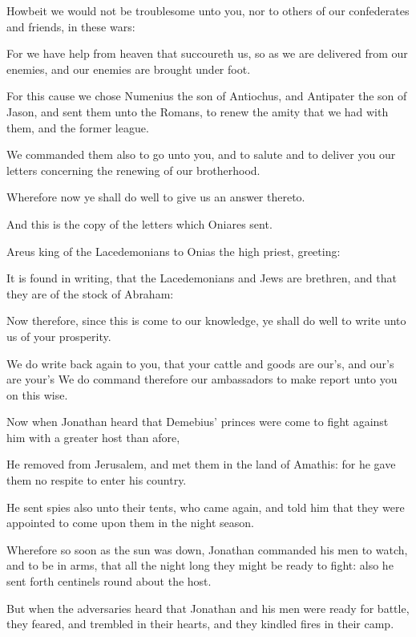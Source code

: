 {\par }{\PP {}Howbeit we would not be troublesome unto you, nor to others of our confederates and friends, in these wars:
\par }{\PP {}For we have help from heaven that succoureth us, so as we are delivered from our enemies, and our enemies are brought under foot.
\par }{\PP {}For this cause we chose Numenius the son of Antiochus, and Antipater the son of Jason, and sent them unto the Romans, to renew the amity that we had with them, and the former league.
\par }{\PP {}We commanded them also to go unto you, and to salute and to deliver you our letters concerning the renewing of our brotherhood.
\par }{\PP {}Wherefore now ye shall do well to give us an answer thereto.
\par }{\PP {}And this is the copy of the letters which Oniares sent.
\par }{\PP {}Areus king of the Lacedemonians to Onias the high priest, greeting:
\par }{\PP {}It is found in writing, that the Lacedemonians and Jews are brethren, and that they are of the stock of Abraham:
\par }{\PP {}Now therefore, since this is come to our knowledge, ye shall do well to write unto us of your prosperity.
\par }{\PP {}We do write back again to you, that your cattle and goods are our’s, and our’s are your’s We do command therefore our ambassadors to make report unto you on this wise.
\par }{\PP {}Now when Jonathan heard that Demebius’ princes were come to fight against him with a greater host than afore,
\par }{\PP {}He removed from Jerusalem, and met them in the land of Amathis: for he gave them no respite to enter his country.
\par }{\PP {}He sent spies also unto their tents, who came again, and told him that they were appointed to come upon them in the night season.
\par }{\PP {}Wherefore so soon as the sun was down, Jonathan commanded his men to watch, and to be in arms, that all the night long they might be ready to fight: also he sent forth centinels round about the host.
\par }{\PP {}But when the adversaries heard that Jonathan and his men were ready for battle, they feared, and trembled in their hearts, and they kindled fires in their camp.
}
